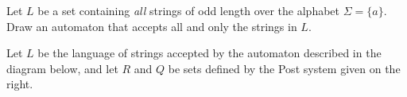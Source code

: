 \documentclass[addpoints]{exam}
\begin{document}
\begin{questions}
\question[3] Let $L$ be a set containing \emph{all} strings of odd length over the 
alphabet $\Sigma = \{a\}$. Draw an automaton that accepts all and only the
strings in $L$.
\vspace{25mm}
%

%
%
%
%
%
%
%
%
%
%
\clearpage
\question Let $L$ be the language of strings accepted by the automaton
described in the diagram below, and let $R$ and $Q$ be sets defined by
the Post system given on the right.


\end{questions}
\end{document}

